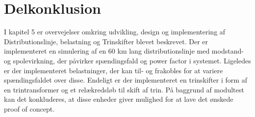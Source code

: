 

\section{Delkonklusion}

I kapitel 5 er overvejelser omkring udvikling, design og implementering af Distributionslinje, belastning og Trinskifter blevet beskrevet. Der er implementeret en simulering af en 60 km lang distributionslinje med modstand- og spolevirkning, der påvirker spændingsfald og power factor i systemet. Ligeledes er der implementeret belastninger, der kan til- og frakobles for at variere spændingsfaldet over disse. Endeligt er der implementeret en trinskifter i form af en trintransformer og et relækredsløb til skift af trin. På baggrund af modultest kan det konkluderes, at disse enheder giver mulighed for at lave det ønskede proof of concept.

